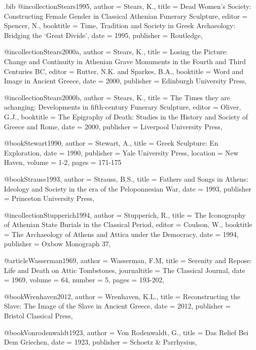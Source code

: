 \begin{filecontents}{\IJSRAidentifier.bib}
	@incollection{Stears1995,
		author = {Stears, K.},
		title = {Dead Women’s Society: Constructing Female Gender in Classical Athenian Funerary Sculpture},
		editor = {Spencer, N.},
		booktitle = {Time, Tradition and Society in Greek Archaeology: Bridging the \enquote*{Great Divide}},
		date = {1995},
		publisher = {Routledge},
	}

	@incollection{Stears2000a,
		author = {Stears, K.},
		title = {Losing the Picture: Change and Continuity in Athenian Grave Monuments in the Fourth and Third Centuries BC},
		editor = {Rutter, N.K. and Sparkes, B.A.},
		booktitle = {Word and Image in Ancient Greece},
		date = {2000},
		publisher = {Edinburgh University Press},
	}

	@incollection{Stears2000b,
		author = {Stears, K.},
		title = {The Times they are achanging: Developments in fifth-century Funerary Sculpture},
		editor = {Oliver, G.J.},
		booktitle = {The Epigraphy of Death: Studies in the History and Society of Greece and Rome},
		date = {2000},
		publisher = {Liverpool University Press},
	}

		@book{Stewart1990,
		author = {Stewart, A.},
		title = {Greek Sculpture: En Exploration},
		date = {1990},
		publisher = {Yale University Press},
		location = {New Haven},
		volume = {1-2},
		pages = {171-175}
	}

	@book{Strauss1993,
		author = {Strauss, B.S.},
		title = {Fathers and Songs in Athens: Ideology and Society in the era of the Peloponnesian War},
		date = {1993},
		publisher = {Princeton University Press},
	}

	@incollection{Stupperich1994,
		author = {Stupperich, R.},
		title = {The Iconography of Athenian State Burials in the Classical Period},
		editor = {Coulson, W.},
		booktitle = {The Archaeology of Athens and Attica under the Democracy},
		date = {1994},
		publisher = {Oxbow Monograph 37},
	}

	@article{Wasserman1969,
		author = {Wasserman, F.M},
		title = {Serenity and Repose: Life and Death on Attic Tombstones},
		journaltitle = {The Classical Journal},
		date = {1969},
		volume = {64},
		number = {5},
		pages = {193-202},
	}

	@book{Wrenhaven2012,
		author = {Wrenhaven, K.L.},
		title = {Reconstructing the Slave: The Image of the Slave in Ancient Greece},
		date = {2012},
		publisher = {Bristol Classical Press},
	}

	@book{Vonrodenwaldt1923,
		author = {Von Rodenwaldt, G.},
		title = {Das Relief Bei Dem Griechen},
		date = {1923},
		publisher = {Schoetz \& Parrhysius},
	}


\end{filecontents}
